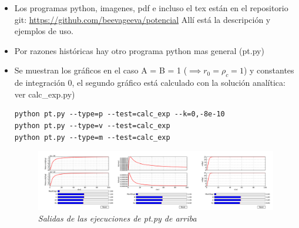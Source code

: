 \documentclass[12pt]{book}
\begin{document}
\begin{itemize}

\item Los programas python, imagenes, pdf e incluso el tex están en el repositorio git: 
	\url{https://github.com/beevageeva/potencial} 
Allí está la descripción y ejemplos de uso.

	 
\item Por razones históricas hay otro programa python mas general  (pt.py)  
\item Se muestran los gráficos en el caso A = B = 1 ($\implies r_0= \rho_c =1$) y constantes de integración 0, el segundo gráfico está calculado con la solución analítica: ver calc\_exp.py)

\begin{verbatim}
python pt.py --type=p --test=calc_exp --k=0,-8e-10 
python pt.py --type=v --test=calc_exp 
python pt.py --type=m --test=calc_exp 

\end{verbatim}
\begin{figure}[!ht]
 \centering
 \includegraphics[scale=0.18]{ptAll.png}
 \caption{\emph{Salidas de las ejecuciones de pt.py de arriba}}
\end{figure}



\end{itemize}
\end{document}
